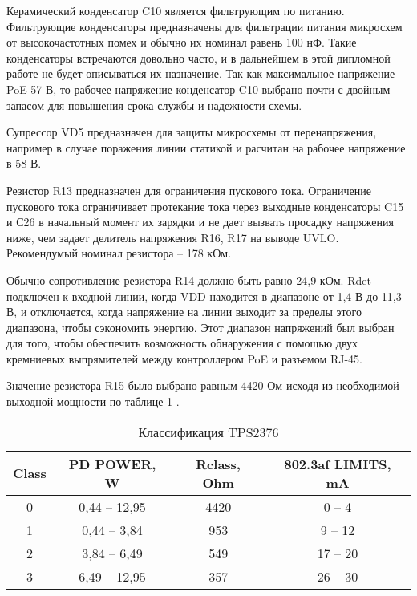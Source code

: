 Керамический конденсатор C10 является фильтрующим по питанию. Фильтрующие конденсаторы предназначены 
для фильтрации питания микросхем от высокочастотных помех и обычно их номинал равень 100 нФ.
Такие конденсаторы встречаются довольно  часто, и в дальнейшем в этой дипломной работе не будет 
описываться их назначение. Так как максимальное напряжение PoE 57 В, то рабочее напряжение 
конденсатор C10 выбрано почти с двойным запасом для повышения срока службы и надежности схемы.

Супрессор VD5 предназначен для защиты микросхемы от перенапряжения, например в случае поражения
линии статикой и расчитан на рабочее напряжение в 58 В. 

Резистор R13 предназначен для ограничения пускового тока. Ограничение пускового тока ограничивает
протекание тока через выходные конденсаторы C15 и С26 в начальный момент их зарядки и не дает 
вызвать просадку напряжения ниже, чем задает делитель напряжения R16, R17 на выводе UVLO. 
Рекомендумый номинал резистора -- 178 кОм.  

Обычно сопротивление резистора R14 должно быть равно 24,9 кОм. Rdet подключен к входной линии, 
когда VDD находится в диапазоне от 1,4 В до 11,3 В, и отключается,
когда напряжение на линии выходит за пределы этого диапазона, чтобы сэкономить энергию.
Этот диапазон напряжений был выбран для того, чтобы обеспечить возможность обнаружения с 
помощью двух кремниевых выпрямителей между контроллером PoE и разъемом RJ-45.

Значение резистора R15 было выбрано равным 4420 Ом исходя из 
необходимой выходной мощности по таблице \ref{ClassTPS2376} \cite{TPS2376:datasheet}.

\begin{table}[H]
    \caption{Классификация TPS2376} 
    \label{ClassTPS2376}
    \begin{center}
    \begin{tabular}{|c|c|c|c|}
    \hline
    Class & PD POWER, W  &  Rclass, Ohm   & 802.3af LIMITS, mA \\ \hline
    0 & 0,44 -- 12,95  & 4420 &0 -- 4  \\ \hline
    1 & 0,44 -- 3,84 & 953 & 9 -- 12   \\ \hline
    2 & 3,84 -- 6,49 & 549 & 17 -- 20  \\ \hline
    3 & 6,49 -- 12,95 & 357 & 26 -- 30   \\ \hline
    \end{tabular}
    \end{center}
\end{table} 

